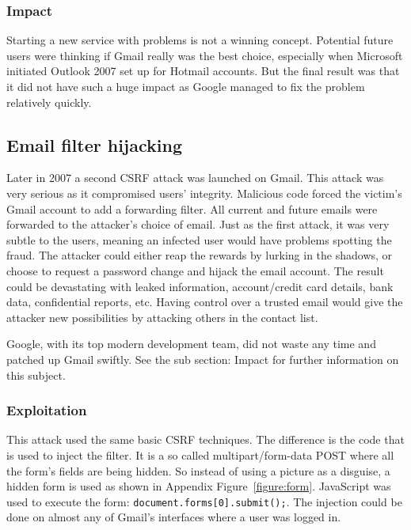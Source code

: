 \documentclass[a4paper,11pt,openany]{report}
\begin{document}
  \subsubsection{Impact}
  Starting a new service with problems is not a winning concept. Potential future users were thinking if Gmail 
  really was the best choice, especially when Microsoft initiated Outlook 2007 set up for Hotmail accounts. 
  But the final result was that it did not have such a huge impact as Google managed to fix the problem relatively
  quickly.
  
  \subsection{Email filter hijacking}
  Later in 2007 a second CSRF attack was launched on Gmail. This attack was very serious as it compromised 
  users' integrity. Malicious code forced the victim's Gmail account to add a forwarding filter. All current 
  and future emails were forwarded to the attacker's choice of email. Just as the first attack, it was very 
  subtle to the users, meaning an infected user would have problems spotting the fraud. The attacker could 
  either reap the rewards by lurking in the shadows, or choose to request a password change and hijack the 
  email account. The result could be devastating with leaked information, account/credit card details, bank 
  data, confidential reports, etc. Having control over a trusted email would give the attacker new possibilities 
  by attacking others in the contact list.
  
  Google, with its top modern development team, did not waste any time and patched up Gmail swiftly. See the
  sub section: Impact for further information on this subject.
  
  \subsubsection{Exploitation}
  This attack used the same basic CSRF techniques. The difference is the code that is used to inject the filter.
  It is a so called multipart/form-data POST where all the form's fields are being hidden. So instead of using
  a picture as a disguise, a hidden form is used as shown in Appendix Figure~\ref{figure:form}. JavaScript was 
  used to execute the form: \texttt{document.forms[0].submit();}. The injection could be done on almost any of Gmail's interfaces where a user was logged in.
  
\end{document}
